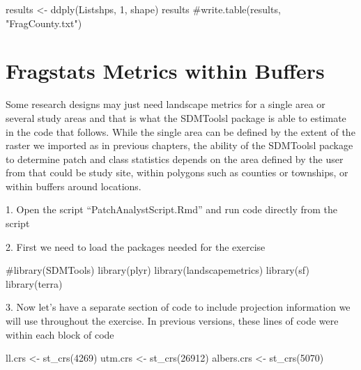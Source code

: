 \documentclass[
  letterpaper,
]{book}
\newenvironment{Shaded}{\begin{snugshade}}{\end{snugshade}}
\newcommand{\CommentTok}[1]{\textcolor[rgb]{0.37,0.37,0.37}{#1}}
\newcommand{\DecValTok}[1]{\textcolor[rgb]{0.68,0.00,0.00}{#1}}
\newcommand{\FunctionTok}[1]{\textcolor[rgb]{0.28,0.35,0.67}{#1}}
\newcommand{\NormalTok}[1]{\textcolor[rgb]{0.00,0.23,0.31}{#1}}
\newcommand{\OtherTok}[1]{\textcolor[rgb]{0.00,0.23,0.31}{#1}}
\begin{document}
\begin{Shaded}
\begin{Highlighting}[]
\NormalTok{results }\OtherTok{\textless{}{-}} \FunctionTok{ddply}\NormalTok{(Listshps, }\DecValTok{1}\NormalTok{, shape)}
\NormalTok{results}
\CommentTok{\#write.table(results, "FragCounty.txt")}
\end{Highlighting}
\end{Shaded}

\hypertarget{fragstats-metrics-within-buffers}{%
\chapter{Fragstats Metrics within
Buffers}\label{fragstats-metrics-within-buffers}}

Some research designs may just need landscape metrics for a single area
or several study areas and that is what the SDMToolsl package is able to
estimate in the code that follows. While the single area can be defined
by the extent of the raster we imported as in previous chapters, the
ability of the SDMToolsl package to determine patch and class statistics
depends on the area defined by the user from that could be study site,
within polygons such as counties or townships, or within buffers around
locations.

1. Open the script ``PatchAnalystScript.Rmd'' and run code directly from
the script

2. First we need to load the packages needed for the exercise

\begin{Shaded}
\begin{Highlighting}[]
\CommentTok{\#library(SDMTools)}
\FunctionTok{library}\NormalTok{(plyr)}
\FunctionTok{library}\NormalTok{(landscapemetrics)}
\FunctionTok{library}\NormalTok{(sf)}
\FunctionTok{library}\NormalTok{(terra)}
\end{Highlighting}
\end{Shaded}

3. Now let's have a separate section of code to include projection
information we will use throughout the exercise. In previous versions,
these lines of code were within each block of code

\begin{Shaded}
\begin{Highlighting}[]
\NormalTok{ll.crs }\OtherTok{\textless{}{-}} \FunctionTok{st\_crs}\NormalTok{(}\DecValTok{4269}\NormalTok{)}
\NormalTok{utm.crs }\OtherTok{\textless{}{-}} \FunctionTok{st\_crs}\NormalTok{(}\DecValTok{26912}\NormalTok{)}
\NormalTok{albers.crs }\OtherTok{\textless{}{-}} \FunctionTok{st\_crs}\NormalTok{(}\DecValTok{5070}\NormalTok{)}
\end{Highlighting}
\end{Shaded}
\end{document}
